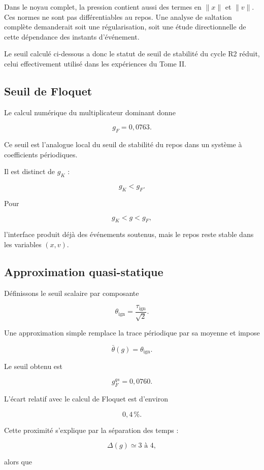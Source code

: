Dans le noyau complet, la pression contient aussi des termes en
\(\|x\|\) et \(\|v\|\). Ces normes ne sont pas différentiables au
repos. Une analyse de saltation complète demanderait soit une
régularisation, soit une étude directionnelle de cette dépendance des
instants d'événement.

Le seuil calculé ci-dessous a donc le statut de seuil de stabilité du
cycle R2 réduit, celui effectivement utilisé dans les expériences du
Tome II.

\subsection{Seuil de Floquet}
\label{annexe-r2-gf}

Le calcul numérique du multiplicateur dominant donne

\[
\boxed{
g_F=0{,}0763.
}
\]

Ce seuil est l'analogue local du seuil de stabilité du repos dans un
système à coefficients périodiques.

Il est distinct de \(g_K\) :

\[
g_K<g_F.
\]

Pour

\[
g_K<g<g_F,
\]

l'interface produit déjà des événements soutenus, mais le repos reste
stable dans les variables \((x,v)\).

\subsection{Approximation quasi-statique}
\label{annexe-r2-quasi-statique}

Définissons le seuil scalaire par composante

\[
\theta_{\mathrm{ign}}
=
\frac{\tau_{\mathrm{ign}}}{\sqrt2}.
\]

Une approximation simple remplace la trace périodique par sa moyenne
et impose

\[
\bar\theta(g)
=
\theta_{\mathrm{ign}}.
\]

Le seuil obtenu est

\[
\boxed{
g_F^{qs}=0{,}0760.
}
\]

L'écart relatif avec le calcul de Floquet est d'environ

\[
0{,}4\,\%.
\]

Cette proximité s'explique par la séparation des temps :

\[
\Delta(g)
\simeq3\text{ à }4,
\]

alors que

